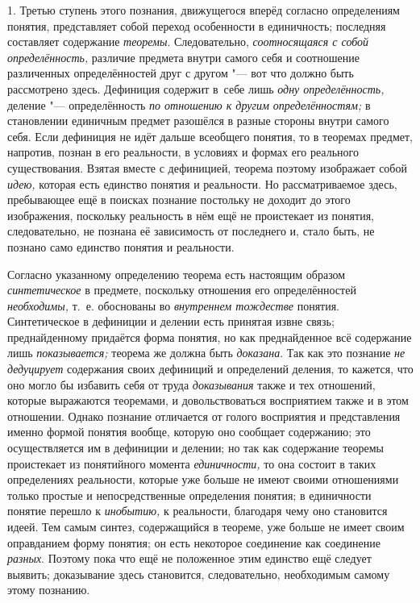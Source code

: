 1. Третью ступень этого познания, движущегося вперёд согласно
определениям понятия, представляет собой переход особенности в единичность;
последняя составляет содержание {\em теоремы}. Следовательно,
{\em соотносящаяся с собой
определённость,} различие предмета внутри самого себя и
соотношение различенных определённостей друг с другом "--- вот
что должно быть рассмотрено здесь. Дефиниция содержит в~себе лишь
{\em одну определённость,} деление "--- определённость {\em по отношению
к другим определённостям;} в становлении единичным предмет разошёлся
в разные стороны внутри самого себя. Если дефиниция не идёт дальше
всеобщего понятия, то в теоремах предмет, напротив, познан в его
реальности, в условиях и формах его реального существования. Взятая вместе
с дефиницией, теорема поэтому изображает собой
{\em идею,} которая есть
единство понятия и реальности. Но рассматриваемое здесь, пребывающее ещё в
поисках познание постольку не доходит до этого изображения, поскольку
реальность в нём ещё не проистекает из понятия, следовательно, не познана
её зависимость от последнего и, стало быть, не познано само единство
понятия и реальности.

Согласно указанному определению теорема есть настоящим образом
{\em синтетическое} в
предмете, поскольку отношения его определённостей
{\em необходимы,} т.~е.
обоснованы во {\em внутреннем
тождестве} понятия. Синтетическое в дефиниции и делении есть
принятая извне связь; преднайденному придаётся форма понятия, но как
преднайденное всё содержание лишь
{\em показывается;}
теорема же должна быть
{\em доказана}. Так как
это познание {\em не дедуцирует}
содержания своих дефиниций и определений деления, то кажется,
что оно могло бы избавить себя от труда
{\em доказывания} также и
тех отношений, которые выражаются теоремами, и довольствоваться восприятием
также и в этом отношении. Однако познание отличается от голого восприятия и
представления именно формой понятия вообще, которую оно сообщает
содержанию; это осуществляется им в дефиниции и делении; но так как
содержание теоремы проистекает из понятийного момента
{\em единичности,} то она
состоит в таких определениях реальности, которые уже больше не имеют своими
отношениями только простые и непосредственные определения понятия; в
единичности понятие перешло к
{\em инобытию,} к
реальности, благодаря чему оно становится идеей. Тем самым синтез,
содержащийся в теореме, уже больше не имеет своим оправданием форму
понятия; он есть некоторое соединение как соединение
{\em разных}. Поэтому
пока что ещё не положенное этим единство ещё следует выявить; доказывание
здесь становится, следовательно, необходимым самому этому познанию.

